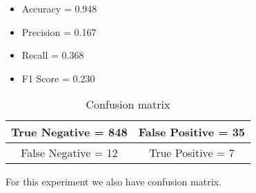 \documentclass{article}
\begin{document}
\begin{itemize}
    \item Accuracy =  0.948
    \item Precision =  0.167
    \item Recall =  0.368
    \item F1 Score =  0.230
\end{itemize}


\begin{wraptable}{r}{0.5\linewidth}
		\begin{tabular}{|c|c|}
			\hline
			True Negative = 848 & False Positive = 35 \\ \hline
			False Negative = 12 &  True Positive = 7 \\ \hline
		\end{tabular}
		\caption{Confusion matrix}
\end{wraptable}For this experiment we also have confusion matrix.
\end{document}

